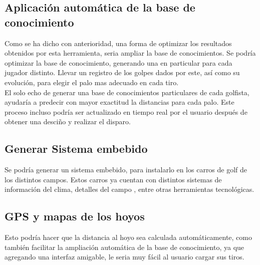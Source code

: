 \documentclass[runningheads,a4paper]{llncs}
\begin{document}
\subsection{Aplicación automática de la base de conocimiento}
Como se ha dicho con anterioridad, una forma de optimizar los resultados obtenidos por esta herramienta,
seria ampliar la base de conocimientos. Se podría optimizar la base de conocimiento, generando una en particular para cada jugador distinto. Llevar un registro de los golpes dados por este, 
así como su evolución, para elegir el palo mas adecuado en cada tiro.\\
El solo echo de generar una base de conocimientos particulares de cada golfista, ayudaría a predecir con 
mayor exactitud la distancias para cada palo. Este proceso incluso podría ser actualizado en tiempo real por el usuario después de obtener una desciño y realizar el disparo.\\

\subsection{Generar Sistema embebido}

Se podría generar un sistema embebido, para instalarlo en los carros de golf de los distintos campos. Estos carros ya cuentan con distintos sistemas de información del clima, detalles del campo , entre otras herramientas tecnológicas. 

\subsection{GPS y mapas de los hoyos}

Esto podría hacer que la distancia al hoyo sea calculada automáticamente, como también facilitar la ampliación automática de la base de conocimiento, ya que agregando una interfaz amigable, le seria muy fácil al usuario cargar sus tiros.
\end{document}
